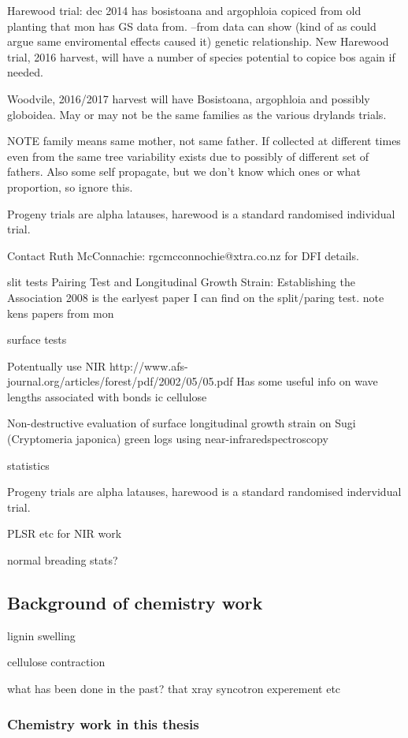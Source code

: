 \documentclass{article}
\begin{document}
Harewood trial:
dec 2014 has bosistoana and argophloia copiced from old planting that mon has GS
data from. --from data can show (kind of as could argue same enviromental
effects caused it) genetic relationship.
New Harewood trial, 2016 harvest, will
have a number of species potential to copice bos again if needed.

Woodvile, 2016/2017 harvest will have Bosistoana, argophloia and possibly globoidea.
May or may not be the same families as the various drylands trials.

NOTE family means same mother, not same father.
If collected at different times even from the same tree variability exists due
to possibly of different set of fathers. Also some self propagate, but we don't
know which ones or what proportion, so ignore this.

Progeny trials are alpha latauses, harewood is a standard randomised individual
trial.

Contact Ruth McConnachie: rgcmcconnochie@xtra.co.nz for DFI details.

slit tests
Pairing Test and Longitudinal Growth Strain: Establishing the Association 2008
is the earlyest paper I can find on the split/paring test. note kens papers from
mon

surface tests

Potentually use NIR
http://www.afs-journal.org/articles/forest/pdf/2002/05/05.pdf
Has some useful info on wave lengths associated with bonds ic cellulose

Non-destructive evaluation of surface longitudinal growth strain
on Sugi (Cryptomeria japonica) green logs using near-infraredspectroscopy

statistics

Progeny trials are alpha latauses, harewood is a standard randomised indervidual
trial.

PLSR etc for NIR work

normal breading stats?

\subsection{Background of chemistry work}

lignin swelling

cellulose contraction

what has been done in the past?
that xray syncotron experement etc

\subsubsection{Chemistry work in this thesis}
\end{document}
